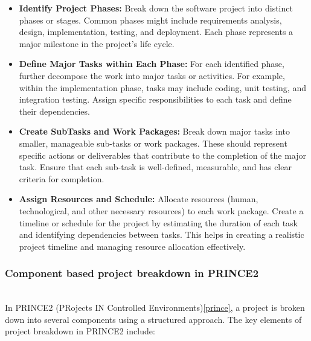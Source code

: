 \documentclass[runningheads]{llncs}
\begin{document}
\begin{itemize}[label=$\bullet$]
    \item \textbf{Identify Project Phases: }
    Break down the software project into distinct phases or stages. Common phases might include requirements analysis, design, implementation, testing, and deployment. Each phase represents a major milestone in the project's life cycle.\\

    \item \textbf{Define Major Tasks within Each Phase:}
    For each identified phase, further decompose the work into major tasks or activities. For example, within the implementation phase, tasks may include coding, unit testing, and integration testing. Assign specific responsibilities to each task and define their dependencies.\\


    \item \textbf{Create SubTasks and Work Packages:}
    Break down major tasks into smaller, manageable sub-tasks or work packages. These should represent specific actions or deliverables that contribute to the completion of the major task. Ensure that each sub-task is well-defined, measurable, and has clear criteria for completion.\\

    \item \textbf{Assign Resources and Schedule:}
    Allocate resources (human, technological, and other necessary resources) to each work package. Create a timeline or schedule for the project by estimating the duration of each task and identifying dependencies between tasks. This helps in creating a realistic project timeline and managing resource allocation effectively.
        
\end{itemize}

\subsubsection{Component based project breakdown in PRINCE2}\mbox{}\\
In PRINCE2 (PRojects IN Controlled Environments)\ref{prince}, a project is broken down into several components using a structured approach. The key elements of project breakdown in PRINCE2 include:
\end{document}
